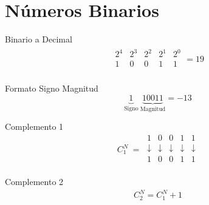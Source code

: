 
\section*{Números Binarios}

\begin{minipage}{0.5\textwidth}
\begin{center} 
    Binario a Decimal
    \begin{align*}
        \begin{matrix}
            2^4 & 2^3 & 2^2 & 2^1 & 2^0 \\
            1  &  0  &  0  &  1  &  1  \\
        \end{matrix} = 19
    \end{align*}
\end{center}
\end{minipage}
\begin{minipage}{0.5\textwidth}
\begin{center} 
    Formato Signo Magnitud
    \[
    \underbrace{1}_\text{Signo}~ \underbrace{10011}_\text{Magnitud} = -13
    \] 
\end{center}    
\end{minipage}
\begin{minipage}{0.5\textwidth}
\begin{center} 
    \vspace{0.5cm} 
    Complemento 1
    \[
    C_1^N ~ = ~ \begin{matrix}
        1  &  0  &  0  &  1  &  1  \\
        \downarrow & \downarrow & \downarrow & \downarrow & \downarrow \\
        1  &  0  &  0  &  1  &  1  \\
    \end{matrix} 
    \] 
\end{center}
\end{minipage}
\begin{minipage}{0.5\textwidth}
\begin{center} 
 Complemento 2
 \vspace{0.4cm}
    \begin{align*}
        C^N_2 = C_1^N + 1
    \end{align*}
\end{center}
\end{minipage}